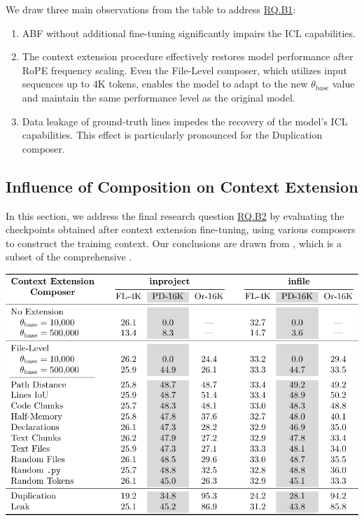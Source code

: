 We draw three main observations from the table to address \hyperref[rq:rq-b1]{RQ.B1}:

\begin{enumerate}
\item ABF without additional fine-tuning significantly impairs the ICL capabilities.
\item The context extension procedure effectively restores model performance after RoPE frequency scaling. Even the File-Level composer, which utilizes input sequences up to 4K tokens, enables the model to adapt to the new \(\theta_{\mathrm{base}}\) value and maintain the same performance level as the original model.
\item Data leakage of ground-truth lines impedes the recovery of the model's ICL capabilities. This effect is particularly pronounced for the Duplication composer.
\end{enumerate}

\subsection{Influence of Composition on Context Extension}\label{sec:influence-of-composition-on-context-extension}

In this section, we address the final research question \hyperref[rq:rq-b2]{RQ.B2} by evaluating the checkpoints obtained after context extension fine-tuning, using various composers to construct the training context. Our conclusions are drawn from , which is a subset of the comprehensive .

\begin{table}[htbp]
    \centering
    \includegraphics[width=\textwidth]{tables/rq-b2.pdf}
    \label{tab:ocoder-extension}
\end{table}

